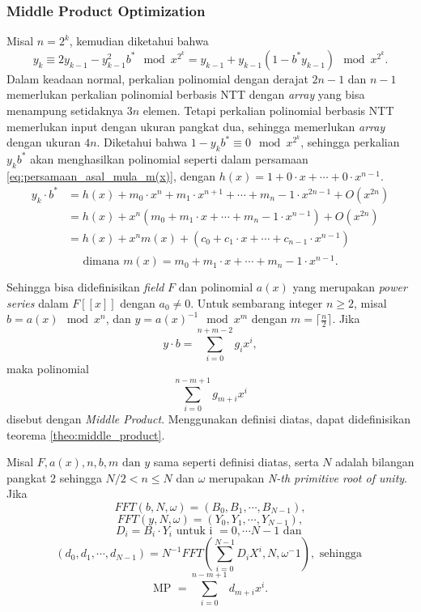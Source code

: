 \subsubsection{Middle Product Optimization}
\indent Misal $ n = 2^k $, kemudian diketahui bahwa
$$ y_k \equiv 2y_{k-1} - y_{k-1}^2 b^* \mod{x^{2^{k}}} = y_{k-1} + y_{k-1}(1 - b^* y_{k-1}) \mod{x^{2^k}}. $$
Dalam keadaan normal, perkalian polinomial dengan derajat $ 2n - 1 $ dan $ n - 1 $ memerlukan perkalian polinomial berbasis NTT dengan \textit{array} yang bisa menampung setidaknya $ 3n $ elemen. Tetapi perkalian polinomial berbasis NTT memerlukan input dengan ukuran pangkat dua, sehingga memerlukan \textit{array} dengan ukuran $ 4n $. Diketahui bahwa $ 1-y_kb^* \equiv 0 \mod{x^{2^k}} $, sehingga perkalian $ y_kb^* $ akan menghasilkan polinomial seperti dalam persamaan \eqref{eq:persamaan_asal_mula_m(x)}, dengan $ h(x) = 1 + 0 \cdot x + \cdots + 0 \cdot x^{n-1}. $
\begin{equation}
	\begin{aligned}
y_k \cdot b^* &= h(x) + m_0 \cdot x^n + m_1 \cdot x^{n+1} + \cdots + m_n-1 \cdot x^{2n-1} + O(x^{2n}) \\
			  &= h(x) + x^n ( m_0 + m_1 \cdot x + \cdots + m_n-1 \cdot x^{n-1}) + O(x^{2n}) \\
			  &= h(x) + x^n m(x) + (c_0 + c_1 \cdot x + \cdots + c_{n-1} \cdot x^{n-1} ) \\
	\end{aligned}
	\label{eq:persamaan_asal_mula_m(x)}
\end{equation}
$$ \text{dimana } m(x) = m_0 + m_1 \cdot x + \cdots + m_n-1 \cdot x^{n-1}. $$

Sehingga bisa didefinisikan \textit{field} $ F $ dan polinomial $ a(x) $ yang merupakan \textit{power series} dalam $ F[[x]] $ dengan $ a_0 \neq 0 $. Untuk sembarang integer $ n \geq 2 $, misal $ b = a(x) \mod{x^n} $, dan $ y = a(x)^{-1} \mod{x^m} $ dengan $ m = \lceil \frac{n}{2} \rceil $. Jika 
$$ y \cdot b = \sum_{i=0}^{n+m-2}g_ix^i, $$ maka polinomial $$ \sum_{i=0}^{n-m+1} g_{m+i} x^i $$ disebut dengan \textit{Middle Product}.
Menggunakan definisi diatas, dapat didefinisikan teorema \ref{theo:middle_product}\cite{middle_product_op}.

\begin{theo}
	\label{theo:middle_product}
	Misal $ F,a(x),n,b,m \text{ dan } y $ sama seperti definisi diatas, serta $ N $ adalah bilangan pangkat 2 sehingga $ N/2 < n \leq N $ dan $ \omega $ merupakan \textit{N-th primitive root of unity}. Jika
		$$ FFT(b,N,\omega) = (B_0, B_1, \cdots, B_{N-1}), $$
		$$ FFT(y,N,\omega) = (Y_0, Y_1, \cdots, Y_{N-1}), $$
		$$ D_i = B_i \cdot Y_i \text{ untuk i } = 0, \cdots N-1 \text{ dan } $$
		$$ (d_0, d_1, \cdots , d_{N-1}) = N^{-1} FFT(\sum_{i=0}^{N-1} D_iX^i, N, \omega^-1), \text{ sehingga } $$
		$$ \text{MP } = \sum_{i=0}^{n-m+1} d_{m+i}x^i. $$
		\label{eq:middle_product}
\end{theo}

